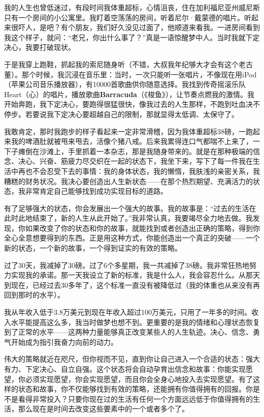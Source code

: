 我的人生也曾低迷过，有段时间我体重超标，心情沮丧，住在加利福尼亚州威尼斯只有一个房间的小公寓里。我盯着空荡荡的房间，听着尼尔·戴蒙德的唱片。听起来很吓人，是吧？有个朋友，我们好久没见过面了，他顺道来看我。一进房间看到我这个样子，就问：“老兄，你出什么事了？”真是一语惊醒梦中人。当时我就下定决心，我要打破现状。

于是我穿上跑鞋，抓起我的索尼随身听（不错，大叔我年纪够大才会有这个老古董）。那个时候，我沉浸在音乐里：当时，一次只能听一张唱片，不像现在用iPod（苹果公司音乐播放器），有10000首歌曲供你随意选择。我找到传奇摇滚乐队Heart（心）的唱片，播放歌曲\textbf{Barracuda}（《梭鱼》），让节奏点燃我的激情。我开始奔跑，我下定决心，要跑得很猛很快，像我过去的人生那样，不跑到吐血决不停步。若要说我下定决心要超越自己的限制，那就显得太低调、太保守了。

我敢肯定，那时我跑步的样子看起来一定非常滑稽，因为我体重超标38磅，一跑起来我的啤酒肚就被甩来甩去，活像个猪八戒。后来我累得连口气都喘不上来了，一下子瘫倒在沙滩上，手里抓着一本杂志，那是我随身带来的。就是在那种极端的信念、决心、兴奋、筋疲力尽交织在一起的状态下，我坐下来，写下了每一件我在生活中再也不会忍受下去的事情：我的身体状态，我的懒惰，我肤浅的亲密关系，我糟糕的财务状况。我决心要创造出人生新状态——在那个热烈期望、充满活力的状态，我非常肯定自己能够找到成功实现目标的道路。

有了足够强大的状态，你会发展出一个强大的故事。我的故事是：“过去的生活在此时此地结束了，新的人生从此开始了。”我非常认真，我要竭尽全力地去做。我发现，你如果改变了你的状态和你的故事，就能找到或者创造出正确的策略，得到你全心全意想要得到的东西。正是用这种方式，你能创造出一个真正的突破——一个新的状态，一个新的故事，一个得到证实的有效的策略。

过了30天，我减掉了30磅。过了6个多星期，我一共减掉了38磅。我非常狂热地努力实现我的承诺。那一天我设立了新的标准，我是什么人，我会容忍什么。从那天到现在，已经过去30多年了，这个标准一直没有被降低过（我的体重也从来没有再回到那时的水平）。

我从年收入低于3.8万美元到现在年收入超过100万美元，只用了一年多的时间。收入水平能提高这么多，我当时做梦也想不到。更重要的是我的情绪和心理状态恢复到了正常的水平——这两种力量能够真正改变某些人的人生轨迹。决心、信念、勇气开始成为指引我奋力向前的动力。

伟大的策略就近在咫尺，但你视而不见，直到你让自己进入一个合适的状态：强大有力、下定决心、自立自强。这个状态将会自动孕育出信念和故事：你能实现愿望，你必须实现愿望，你会实现愿望，而且你会全身心地投入去实现愿望。有了这样的状态和故事，你不仅能够找到有效的策略，还能拥有你值得拥有的回报。你是不是看得非常投入？只要你现在过的生活有任何一个方面远远低于你值得拥有的生活，那么现在是时间去改变这些要素中的一个或者多个了。

